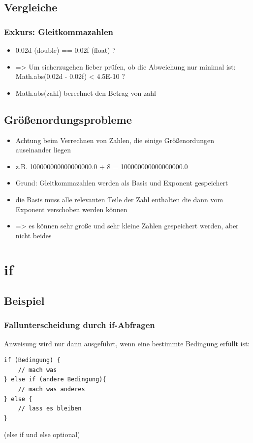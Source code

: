 \documentclass[final]{beamer}
\begin{document}
\subsection{Vergleiche}
\begin{frame}
	\frametitle{Exkurs: Gleitkommazahlen}
	\begin{itemize}
		\item{0.02d (double) == 0.02f (float) ?}
		\item{=> Um sicherzugehen lieber prüfen, ob die Abweichung nur minimal ist: \\
		Math.abs(0.02d - 0.02f) < 4.5E-10 ?}
		\item{Math.abs(zahl) berechnet den Betrag von zahl}
	\end{itemize}
\end{frame}

\subsection{Größenordungsprobleme}
\begin{frame}
	\begin{itemize}
		\item{Achtung beim Verrechnen von Zahlen, die einige Größenordungen auseinander liegen}
		\item{z.B. 100000000000000000.0 + 8 = 100000000000000000.0}
		\item{Grund: Gleitkommazahlen werden als Basis und Exponent gespeichert}
		\item{die Basis muss alle relevanten Teile der Zahl enthalten die dann vom Exponent verschoben werden können}
		\item{=> es können sehr große und sehr kleine Zahlen gespeichert werden, aber nicht beides}
	\end{itemize}
\end{frame}

\section{if}
\subsection{Beispiel}
\begin{frame}[containsverbatim]
	\frametitle{Fallunterscheidung durch if-Abfragen}
	Anweisung wird nur dann ausgeführt, wenn eine bestimmte Bedingung erfüllt ist:
	\begin{lstlisting}
if (Bedingung) {
	// mach was
} else if (andere Bedingung){
	// mach was anderes
} else {
	// lass es bleiben
}
	\end{lstlisting}
	(else if und else optional)
\end{frame}
\end{document}
